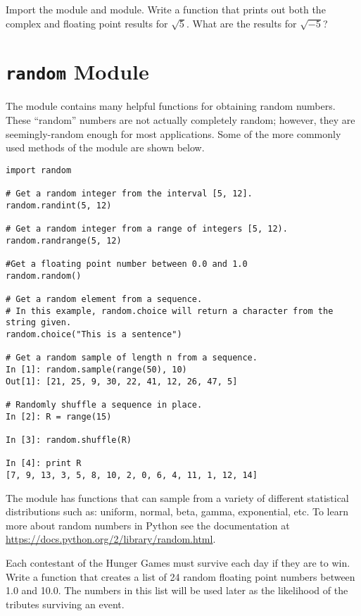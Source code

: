 \begin{problem}
Import the  module and  module. Write a function that prints out both the complex and floating point results for $\sqrt{5}$.  What are the results for $\sqrt{-5}$?
\end{problem}

\section*{\texttt{random} Module}
The  module contains many helpful functions for obtaining random numbers.
These ``random'' numbers are not actually completely random; however, they are seemingly-random enough for most applications.
Some of the more commonly used methods of the  module are shown below.
\begin{lstlisting}
import random

# Get a random integer from the interval [5, 12].
random.randint(5, 12)

# Get a random integer from a range of integers [5, 12).
random.randrange(5, 12)

#Get a floating point number between 0.0 and 1.0
random.random()

# Get a random element from a sequence. 
# In this example, random.choice will return a character from the string given.
random.choice("This is a sentence")

# Get a random sample of length n from a sequence.
In [1]: random.sample(range(50), 10)
Out[1]: [21, 25, 9, 30, 22, 41, 12, 26, 47, 5]

# Randomly shuffle a sequence in place.
In [2]: R = range(15)

In [3]: random.shuffle(R)

In [4]: print R
[7, 9, 13, 3, 5, 8, 10, 2, 0, 6, 4, 11, 1, 12, 14]

\end{lstlisting}

\begin{info}
The  module has functions that can sample from a variety of different statistical distributions such as: uniform, normal, beta, gamma, exponential, etc. To learn more about random numbers in Python see the documentation at \url{https://docs.python.org/2/library/random.html}.
\end{info}

\begin{problem}
Each contestant of the Hunger Games must survive each day if they are to win. Write a function that creates a list of 24 random floating point numbers between 1.0 and 10.0. The numbers in this list will be used later as the likelihood of the tributes surviving an event.
\end{problem}

